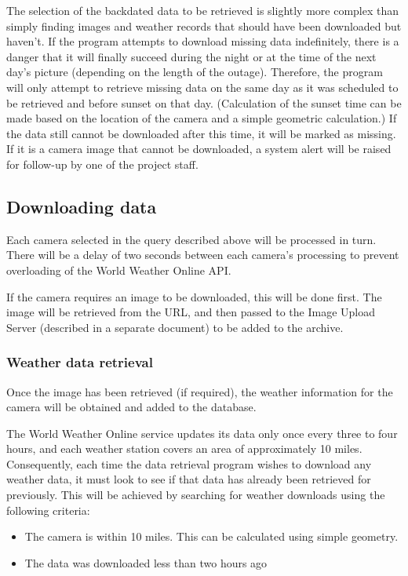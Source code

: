 \documentclass[11pt]{article}
\begin{document}
The selection of the backdated data to be retrieved is slightly more complex than simply finding images and weather records that should have been downloaded but haven't. If the program attempts to download missing data indefinitely, there is a danger that it will finally succeed during the night or at the time of the next day's picture (depending on the length of the outage). Therefore, the program will only attempt to retrieve missing data on the same day as it was scheduled to be retrieved and before sunset on that day. (Calculation of the sunset time can be made based on the location of the camera and a simple geometric calculation.) If the data still cannot be downloaded after this time, it will be marked as missing. If it is a camera image that cannot be downloaded, a system alert will be raised for follow-up by one of the project staff.

\subsection{Downloading data}
Each camera selected in the query described above will be processed in turn. There will be a delay of two seconds between each camera's processing to prevent overloading of the World Weather Online API.

If the camera requires an image to be downloaded, this will be done first. The image will be retrieved from the URL, and then passed to the Image Upload Server (described in a separate document) to be added to the archive.

\subsubsection{Weather data retrieval}
Once the image has been retrieved (if required), the weather information for the camera will be obtained and added to the database.

The World Weather Online service updates its data only once every three to four hours, and each weather station covers an area of approximately 10 miles. Consequently, each time the data retrieval program wishes to download any weather data, it must look to see if that data has already been retrieved for previously. This will be achieved by searching for weather downloads using the following criteria:

\begin{itemize}
\item The camera is within 10 miles. This can be calculated using simple geometry.
\item The data was downloaded less than two hours ago
\end{itemize}
\end{document}
